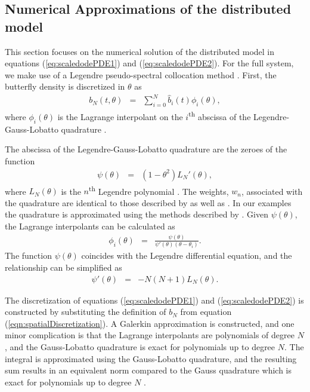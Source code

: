 \documentclass[review,authoryear]{elsarticle}
\begin{document}
\subsection{Numerical Approximations of the distributed model}
\label{numericalApproximation}

This section focuses on the numerical solution of the distributed model in equations (\ref{eq:scaledodePDE1}) and
(\ref{eq:scaledodePDE2}). For the full system, we make use of a
Legendre pseudo-spectral collocation
method \citep{spectralMethodsFluids,hesthaven_gottlieb_gottlieb_2007,gottlieb1977numerical}. First,
the butterfly density is discretized in $\theta$ as
\begin{eqnarray}
  \label{eqn:spatialDiscretization}
  b_N(t,\theta) & = & \sum^N_{i=0} \hat{b}_i(t) \phi_i(\theta),
\end{eqnarray}
where $\phi_i(\theta)$ is the Lagrange interpolant on the
$i$\textsuperscript{th} abscissa of the Legendre-Gauss-Lobatto
quadrature \citep{hesthaven_gottlieb_gottlieb_2007}.

The abscissa of the Legendre-Gauss-Lobatto quadrature are the zeroes
of the function
\begin{eqnarray}
  \psi(\theta) & = & \left(1-\theta^2\right) L_{N}'(\theta),
\end{eqnarray}
where $L_N(\theta)$ is the $n$\textsuperscript{th} Legendre
polynomial \citep{davis2007methods}.  The weights, $w_n$, associated
with the quadrature are identical to those described by
\citet{davis2007methods} as well as \citet{gaussQuadratureRules}. In our examples the quadrature is
approximated using the methods described by \citet{gaussQuadratureRules}.  Given $\psi(\theta)$, the Lagrange
interpolants can be calculated as
\begin{eqnarray}
  \phi_i(\theta) & = & \frac{\psi(\theta)}{\psi'(\theta)(\theta-\theta_i)}.
\end{eqnarray}
The function $\psi(\theta)$ coincides with the Legendre differential
equation, and the relationship can be simplified as
\begin{eqnarray}
  \psi'(\theta) & = & -N(N+1)L_N(\theta).
\end{eqnarray}

The discretization of equations (\ref{eq:scaledodePDE1}) and
(\ref{eq:scaledodePDE2}) is constructed by substituting the definition
of $b_N$ from equation (\ref{eqn:spatialDiscretization}). A Galerkin
approximation is constructed, and one minor complication is that the
Lagrange interpolants are polynomials of degree $N$, and the
Gauss-Lobatto quadrature is exact for polynomials up to degree
$N$. The integral is approximated using the Gauss-Lobatto quadrature,
and the resulting sum results in an equivalent norm compared to the
Gauss quadrature which is exact for polynomials up to degree
$N$ \citep{SobolevCanutoQuarteroni}.
\end{document}
